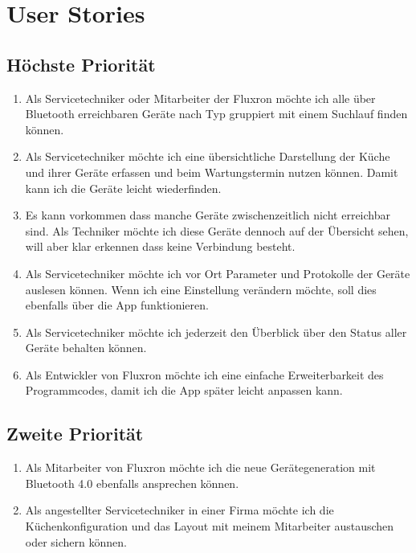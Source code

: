 
\section{User Stories}
\label{sec:User Stories}

\subsection{Höchste Priorität}
\label{subsec:Höchste Priorität}
\begin{enumerate}
\item Als Servicetechniker oder Mitarbeiter der Fluxron möchte ich alle über Bluetooth erreichbaren Geräte nach Typ gruppiert mit einem Suchlauf finden können.
\item Als Servicetechniker möchte ich eine übersichtliche Darstellung der Küche und ihrer Geräte erfassen und beim Wartungstermin nutzen können. Damit kann ich die Geräte leicht wiederfinden.
\item Es kann vorkommen dass manche Geräte zwischenzeitlich nicht erreichbar sind. Als Techniker möchte ich diese Geräte dennoch auf der Übersicht sehen, will aber klar erkennen dass keine Verbindung besteht.
\item Als Servicetechniker möchte ich vor Ort Parameter und Protokolle der Geräte auslesen können. Wenn ich eine Einstellung verändern möchte, soll dies ebenfalls über die App funktionieren.
\item Als Servicetechniker möchte ich jederzeit den Überblick über den Status aller Geräte behalten können.
\item Als Entwickler von Fluxron möchte ich eine einfache Erweiterbarkeit des Programmcodes, damit ich die App später leicht anpassen kann.
\end{enumerate}

\subsection{Zweite Priorität}
\label{subsec:Zweite Priorität}

\begin{enumerate}[resume]
\item Als Mitarbeiter von Fluxron möchte ich die neue Gerätegeneration mit Bluetooth 4.0 ebenfalls ansprechen können.
\item Als angestellter Servicetechniker in einer Firma möchte ich die Küchenkonfiguration und das Layout mit meinem Mitarbeiter austauschen oder sichern können.
\end{enumerate}

